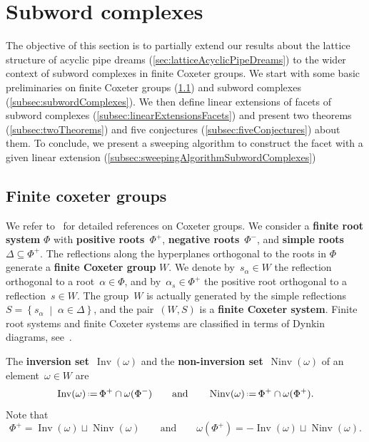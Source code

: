 \documentclass[reqno]{amsart}
\theoremstyle{definition}
\newcommand{\set}[2]{\left\{ #1 \;\middle|\; #2 \right\}} %
\newcommand{\eqdef}{\mbox{\,\raisebox{0.2ex}{\scriptsize\ensuremath{\mathrm:}}\ensuremath{=}\,}} %
\DeclareMathOperator{\Inv}{Inv} %
\DeclareMathOperator{\Ninv}{Ninv} %
\newcommand{\defn}[1]{\textbf{\textsf{\color{PineGreen} #1}}} %
\begin{document}
\section{Subword complexes}
\label{sec:subwordComplexes}

The objective of this section is to partially extend our results about the lattice structure of acyclic pipe dreams (\cref{sec:latticeAcyclicPipeDreams}) to the wider context of subword complexes in finite Coxeter groups.
We start with some basic preliminaries on finite Coxeter groups (\cref{subsec:finiteCoxeterGroups}) and subword complexes (\cref{subsec:subwordComplexes}).
We then define linear extensions of facets of subword complexes (\cref{subsec:linearExtensionsFacets}) and present two theorems (\cref{subsec:twoTheorems}) and five conjectures (\cref{subsec:fiveConjectures}) about them.
To conclude, we present a sweeping algorithm to construct the facet with a given linear extension (\cref{subsec:sweepingAlgorithmSubwordComplexes})


\subsection{Finite coxeter groups} 
\label{subsec:finiteCoxeterGroups}

We refer to~\cite{BjornerBrenti, Humphreys} for detailed references on Coxeter groups. 
We consider a \defn{finite root system} $\Phi$ with \defn{positive roots}~$\Phi^+$, \defn{negative roots}~$\Phi^-$, and \defn{simple roots} $\Delta \subseteq \Phi^+$.
The reflections along the hyperplanes orthogonal to the roots in $\Phi$ generate a \defn{finite Coxeter group} $W$.
We denote by~$s_\alpha \in W$ the reflection orthogonal to a root~$\alpha \in \Phi$, and by~$\alpha_s \in \Phi^+$ the positive root orthogonal to a reflection~$s \in W$.
The group~$W$ is actually generated by the simple reflections~$S = \set{s_\alpha}{\alpha \in \Delta}$, and the pair~$(W,S)$ is a \defn{finite Coxeter system}.
Finite root systems and finite Coxeter systems are classified in terms of Dynkin diagrams, see~\cite{Humphreys}. 

The \defn{inversion set}~$\Inv(\omega)$ and the \defn{non-inversion set}~$\Ninv(\omega)$ of an element~$\omega \in W$ are
\[
\Inv(\omega) \eqdef \Phi^+ \cap \omega(\Phi^-)
\qquad\text{and}\qquad
\Ninv(\omega) \eqdef \Phi^+ \cap \omega(\Phi^+).
\]
Note that
\[
\Phi^+ = \Inv(\omega) \sqcup \Ninv(\omega)
\qquad\text{and}\qquad
\omega(\Phi^+) = -\Inv(\omega) \sqcup \Ninv(\omega).
\]
\end{document}
